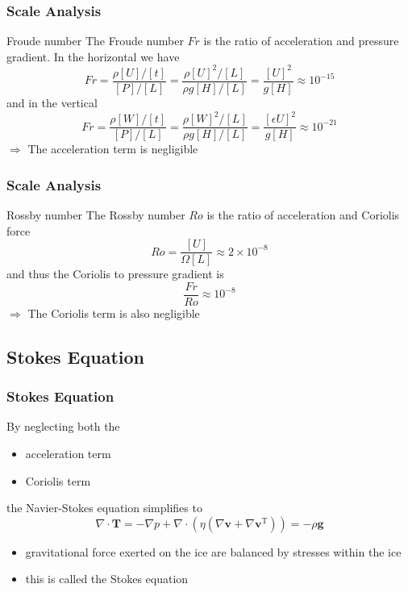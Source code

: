 \documentclass[hide notes,intlimits]{beamer}
\begin{document}
\begin{frame}
  \frametitle{Scale Analysis}
  \begin{block}{Froude number}
    The \alert{Froude number $Fr$} is the ratio of acceleration and pressure gradient. In the horizontal we have
  \begin{equation*}
    Fr = \frac{\rho[U]/[t]}{[P]/[L]} = \frac{\rho[U]^{2}/[L]}{\rho g [H]/[L]} = \frac{[U]^{2}}{g[H]} \approx 10^{-15}
  \end{equation*}
  and in the vertical
  \begin{equation*}
    Fr = \frac{\rho[W]/[t]}{[P]/[L]} = \frac{\rho[W]^{2}/[L]}{\rho g [H]/[L]} = \frac{[\epsilon U]^{2}}{g[H]} \approx 10^{-21}
  \end{equation*}
  $\Rightarrow$ The \alert{acceleration term} is \alert{negligible}
  \end{block}
\end{frame}


\begin{frame}
  \frametitle{Scale Analysis}
  \begin{block}{Rossby number}
    The \alert{Rossby number $Ro$} is the ratio of acceleration and Coriolis force
  \begin{equation*}
    Ro = \frac{[U]}{\Omega [L]} \approx 2\times10^{-8}
  \end{equation*}
  and thus the Coriolis to pressure gradient is
  \begin{equation*}
   \frac{Fr}{Ro}\approx 10^{-8}
  \end{equation*}
  $\Rightarrow$ The \alert{Coriolis term} is also \alert{negligible}
  \end{block}
\end{frame}


\subsection{Stokes Equation}


\begin{frame}
  \frametitle{Stokes Equation}
  By neglecting both the
  \begin{itemize}
  \item acceleration term
  \item Coriolis term
  \end{itemize}
  the Navier-Stokes equation simplifies to
  \begin{equation}
    \nabla \cdot \mathbf{T} =  - \nabla p + \nabla \cdot \left(\eta\left(\nabla \mathbf{v} + \nabla \mathbf{v}^{\text{T}}\right)\right) = - \rho \mathbf{g}
  \end{equation}
  \begin{itemize}
  \item gravitational force exerted on the ice are balanced by stresses within the ice
  \item this is called the \alert{Stokes equation}
  \end{itemize}
\end{frame}
\end{document}
